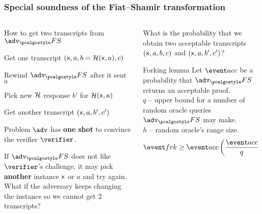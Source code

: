 \documentclass[aspectratio=169]{beamer}
\renewcommand{\emph}[1]{\textbf{#1}}
\newcommand{\advfs}{\adv_\fs}
\renewcommand{\myskip}{0.5\baselineskip}
\begin{document}
\begin{frame}
  \frametitle{Special soundness of the Fiat--Shamir transformation}
  \begin{columns}
    \begin{column}{0.5\linewidth}
  \begin{block}{How to get two transcripts from $\advfs$}
  \begin{compactenum} 
  \item Get one transcript $(\mathsf{x}, a, b = \mathcal{H}(\mathsf{x}, a), c)$ \pause
  \item Rewind $\advfs$ after it sent $a$ \pause
  \item Pick new $\mathcal{H}$ response $b'$ for $\mathcal{H}(\mathsf{x}, a)$ \pause
  \item Get another transcript $(\mathsf{x}, a, b', c')$
  \end{compactenum}
\end{block}\pause
  
  \begin{block}{Problem}
    $\adv$ has \emph{one shot} to convince the verifier $\verifier$.

    If $\advfs$ does not like $\verifier$'s challenge, it may pick \emph{another}
    instance $\mathsf{x}$ or $a$ and try again.\\[\myskip]
    What if the adversary keeps changing the instance so we cannot get $2$
    transcripts?\\[\myskip]
  \end{block}
\end{column}\pause
\begin{column}{0.5\linewidth}
  \begin{block}{}
    What is the probability that we obtain two acceptable transcripts
    $(\mathsf{x}, a, b, c)$ and $(\mathsf{x}, a, b', c')$?
  \end{block}\pause
  \begin{block}{Forking lemma}
    Let $\accProb$ be a probability that $\advfs$ returns an acceptable proof.\\
    $q$ -- upper bound for a number of random oracle queries $\advfs$ may
    make.\\
    $h$ -- random oracle's range size.
    \[
      \frkProb \geq \accProb \left(\frac{\accProb}{q} - \frac{1}{h}\right).
    \]
  \end{block}
\end{column}
\end{columns}
\vspace*{0.0cm}
\centering{}
\end{frame}
\end{document}
